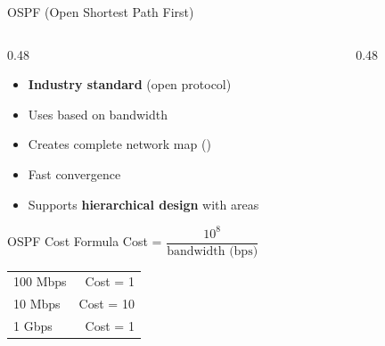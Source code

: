 \documentclass[aspectratio=169]{beamer}  %
\begin{document}
\begin{frame}{OSPF (Open Shortest Path First)}
    \begin{columns}[T]
        \begin{column}{0.48\textwidth}
            \begin{itemize}
                \item \textbf{Industry standard} (open protocol)
                \item Uses  based on bandwidth
                \item Creates complete network map ()
                \item Fast convergence
                \item Supports \textbf{hierarchical design} with areas
            \end{itemize}
            
            \vspace{0.2em}
            \begin{block}{OSPF Cost Formula}
                \centering
                Cost = $\dfrac{10^8}{\text{bandwidth (bps)}}$
                
                \vspace{0.3em}
                \small
                \begin{tabular}{l r}
                    100 Mbps & Cost = 1 \\
                    10 Mbps & Cost = 10 \\
                    1 Gbps & Cost = 1 \\
                \end{tabular}
            \end{block}
        \end{column}
        \begin{column}{0.48\textwidth}
            \begin{center}
\end{center}
\end{column}
\end{columns}
\end{frame}
\end{document}
